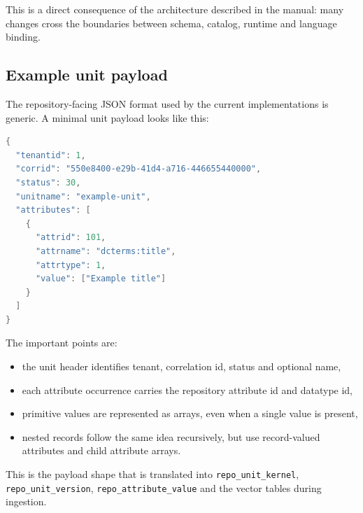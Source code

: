 This is a direct consequence of the architecture described in the manual: many changes cross the boundaries between schema, catalog, runtime and language binding.

\subsection{Example unit payload}

The repository-facing JSON format used by the current implementations is generic. A minimal unit payload looks like this:

\begin{lstlisting}[language=Java,
    framesep=8pt,
    xleftmargin=5pt,
    framexleftmargin=5pt,
    frame=tb,
    framerule=0pt]
{
  "tenantid": 1,
  "corrid": "550e8400-e29b-41d4-a716-446655440000",
  "status": 30,
  "unitname": "example-unit",
  "attributes": [
    {
      "attrid": 101,
      "attrname": "dcterms:title",
      "attrtype": 1,
      "value": ["Example title"]
    }
  ]
}
\end{lstlisting}

The important points are:
\begin{itemize}
\item the unit header identifies tenant, correlation id, status and optional name,
\item each attribute occurrence carries the repository attribute id and datatype id,
\item primitive values are represented as arrays, even when a single value is present,
\item nested records follow the same idea recursively, but use record-valued attributes and child attribute arrays.
\end{itemize}

This is the payload shape that is translated into \texttt{repo\_unit\_kernel}, \texttt{repo\_unit\_version}, \texttt{repo\_attribute\_value} and the vector tables during ingestion.
